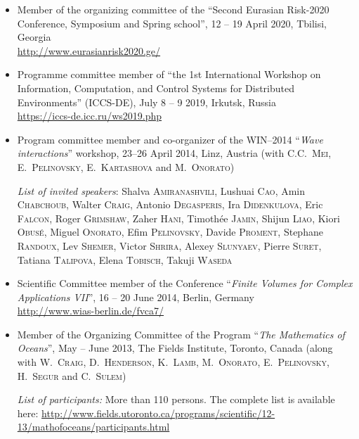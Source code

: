 \documentclass[final, a4paper, oneside, 12pt]{article}
\numberwithin{equation}{section}
\begin{document}
\begin{itemize}
  \item Member of the organizing committee of the ``Second Eurasian Risk-2020 Conference, Symposium and Spring school'', 12 -- 19 April 2020, Tbilisi, Georgia \\
  \url{http://www.eurasianrisk2020.ge/}
  
  \item Programme committee member of ``the 1st International Workshop on Information, Computation, and Control Systems for Distributed Environments'' (ICCS-DE), July 8 -- 9 2019, Irkutsk, Russia \\
  \url{https://iccs-de.icc.ru/ws2019.php}

  \item Program committee member and co-organizer of the WIN--2014 ``\textit{Wave interactions}'' workshop, 23--26 April 2014, Linz, Austria (with C.C.~\textsc{Mei}, E.~\textsc{Pelinovsky}, E.~\textsc{Kartashova} and M.~\textsc{Onorato})
  
  \textit{List of invited speakers}: Shalva \textsc{Amiranashvili}, Lushuai \textsc{Cao}, Amin \textsc{Chabchoub}, Walter \textsc{Craig}, Antonio \textsc{Degasperis}, Ira \textsc{Didenkulova}, Eric \textsc{Falcon}, Roger \textsc{Grimshaw}, Zaher \textsc{Hani}, Timoth\'ee \textsc{Jamin}, Shijun \textsc{Liao}, Kiori \textsc{Obus\'e}, Miguel \textsc{Onorato}, Efim \textsc{Pelinovsky}, Davide \textsc{Proment}, Stephane \textsc{Randoux}, Lev \textsc{Shemer}, Victor \textsc{Shrira}, Alexey \textsc{Slunyaev}, Pierre \textsc{Suret}, Tatiana \textsc{Talipova}, Elena \textsc{Tobisch}, Takuji \textsc{Waseda}
  
  \item Scientific Committee member of the Conference ``\textit{Finite Volumes for Complex Applications VII}'', 16 -- 20 June 2014, Berlin, Germany \\
  \url{http://www.wias-berlin.de/fvca7/}

  \item Member of the Organizing Committee of the Program ``\textit{The Mathematics of Oceans}'', May -- June 2013, The Fields Institute, Toronto, Canada (along with W.~\textsc{Craig}, D.~\textsc{Henderson}, K.~\textsc{Lamb}, M.~\textsc{Onorato}, E.~\textsc{Pelinovsky}, H.~\textsc{Segur} and C.~\textsc{Sulem})
  
  \textit{List of participants:} More than 110 persons. The complete list is available here:
  \href{http://www.fields.utoronto.ca/programs/scientific/12-13/mathofoceans/participants.html}%
  {\small http://www.fields.utoronto.ca/programs/scientific/12-13/mathofoceans/participants.html}


\end{itemize}
\end{document}
